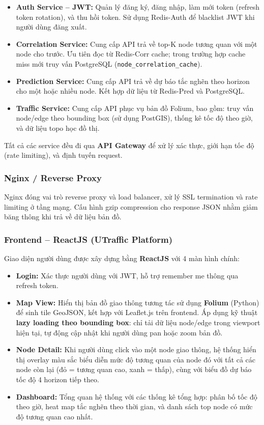 \begin{itemize}
    \item \textbf{Auth Service -- JWT:} Quản lý đăng ký, đăng nhập, làm mới token (refresh token rotation), và thu hồi token. Sử dụng Redis-Auth để blacklist JWT khi người dùng đăng xuất.
    \item \textbf{Correlation Service:} Cung cấp API trả về top-K node tương quan với một node cho trước. Ưu tiên đọc từ Redis-Corr cache; trong trường hợp cache miss mới truy vấn PostgreSQL (\texttt{node\_correlation\_cache}).
    \item \textbf{Prediction Service:} Cung cấp API trả về dự báo tắc nghẽn theo horizon cho một hoặc nhiều node. Kết hợp dữ liệu từ Redis-Pred và PostgreSQL.
    \item \textbf{Traffic Service:} Cung cấp API phục vụ bản đồ Folium, bao gồm: truy vấn node/edge theo bounding box (sử dụng PostGIS), thống kê tốc độ theo giờ, và dữ liệu topo học đồ thị.
\end{itemize}

Tất cả các service đều đi qua \textbf{API Gateway} để xử lý xác thực, giới hạn tốc độ (rate limiting), và định tuyến request.

\subsubsection{Nginx / Reverse Proxy}
Nginx đóng vai trò reverse proxy và load balancer, xử lý SSL termination và rate limiting ở tầng mạng. Cấu hình gzip compression cho response JSON nhằm giảm băng thông khi trả về dữ liệu bản đồ.

\subsubsection{Frontend -- ReactJS (UTraffic Platform)}
Giao diện người dùng được xây dựng bằng \textbf{ReactJS} với 4 màn hình chính:

\begin{itemize}
    \item \textbf{Login:} Xác thực người dùng với JWT, hỗ trợ remember me thông qua refresh token.
    \item \textbf{Map View:} Hiển thị bản đồ giao thông tương tác sử dụng \textbf{Folium} (Python) để sinh tile GeoJSON, kết hợp với Leaflet.js trên frontend. Áp dụng kỹ thuật \textbf{lazy loading theo bounding box}: chỉ tải dữ liệu node/edge trong viewport hiện tại, tự động cập nhật khi người dùng pan hoặc zoom bản đồ.
    \item \textbf{Node Detail:} Khi người dùng click vào một node giao thông, hệ thống hiển thị overlay màu sắc biểu diễn mức độ tương quan của node đó với tất cả các node còn lại (đỏ = tương quan cao, xanh = thấp), cùng với biểu đồ dự báo tốc độ 4 horizon tiếp theo.
    \item \textbf{Dashboard:} Tổng quan hệ thống với các thống kê tổng hợp: phân bố tốc độ theo giờ, heat map tắc nghẽn theo thời gian, và danh sách top node có mức độ tương quan cao nhất.
\end{itemize}

